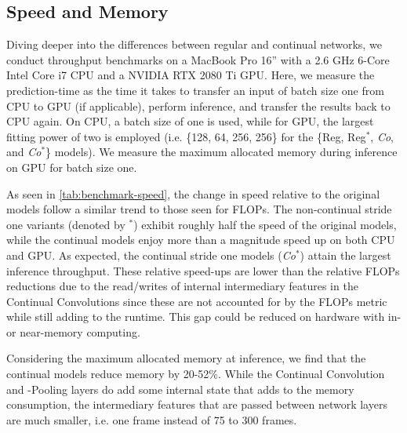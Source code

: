 \documentclass[journal]{IEEEtran}
\theoremstyle{definition}
\begin{document}
\subsection{Speed and Memory}
Diving deeper into the differences between regular and continual networks, we conduct throughput benchmarks on a MacBook Pro 16” with a 2.6 GHz 6-Core Intel Core i7 CPU and a NVIDIA RTX 2080 Ti GPU.
Here, we measure the prediction-time as the time it takes to transfer an input of batch size one from CPU to GPU (if applicable), perform inference, and transfer the results back to CPU again.
On CPU, a batch size of one is used, while for GPU, the largest fitting power of two is employed (i.e. \{128, 64, 256, 256\} for the \{Reg, Reg$^*$, \textit{Co}, and \textit{Co}$^*$\} models).
We measure the maximum allocated memory during inference on GPU for batch size one.

As seen in \cref{tab:benchmark-speed}, the change in speed relative to the original models follow a similar trend to those seen for FLOPs. The non-continual stride one variants (denoted by $^*$) exhibit roughly half the speed of the original models, while the continual models enjoy more than a magnitude speed up on both CPU and GPU. As expected, the continual stride one models (\textit{Co}$^*$) attain the largest inference throughput. These relative speed-ups are lower than the relative FLOPs reductions due to the read/writes of internal intermediary features in the Continual Convolutions since these are not accounted for by the FLOPs metric while still adding to the runtime. This gap could be reduced on hardware with in- or near-memory computing.

Considering the maximum allocated memory at inference, 
we find that the continual models reduce memory by 20-52\%. While the Continual Convolution and -Pooling layers do add some internal state that adds to the memory consumption, the intermediary features that are passed between network layers are much smaller, i.e. one frame instead of 75 to 300 frames.
\end{document}
